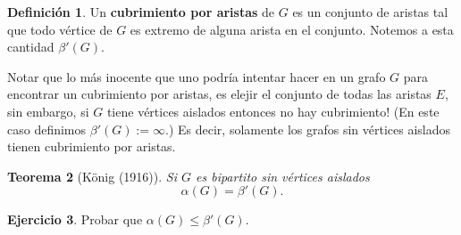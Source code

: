 \documentclass[12pt]{report}
\theoremstyle{plain}
\newtheorem{theorem}{Teorema}[section]
\theoremstyle{definition}
\newtheorem{definition}[theorem]{Definición}
\newtheorem{exercise}[theorem]{Ejercicio}
\begin{document}
\begin{definition}
Un \textbf{cubrimiento por aristas} de $G$ es un conjunto de aristas tal que todo vértice de $G$ es extremo de alguna arista en el conjunto. Notemos a esta cantidad $\beta ' (G)$.
\end{definition}
Notar que lo más inocente que uno podría intentar hacer en un grafo $G$ para encontrar un cubrimiento por aristas, es elejir el conjunto de todas las aristas $E$, sin embargo, si $G$ tiene vértices aislados entonces no hay cubrimiento! (En este caso definimos $\beta ' (G) := \infty$.) Es decir, solamente los grafos sin vértices aislados tienen cubrimiento por aristas.

\begin{theorem}[König (1916)]
Si $G$ es bipartito sin vértices aislados
\[
    \boxed{\alpha (G) = \beta ' (G) .}
\]
\end{theorem}

\begin{exercise}
Probar que $\alpha (G) \leq \beta ' (G)$.
\end{exercise}



















\newpage


{}
\end{document}
